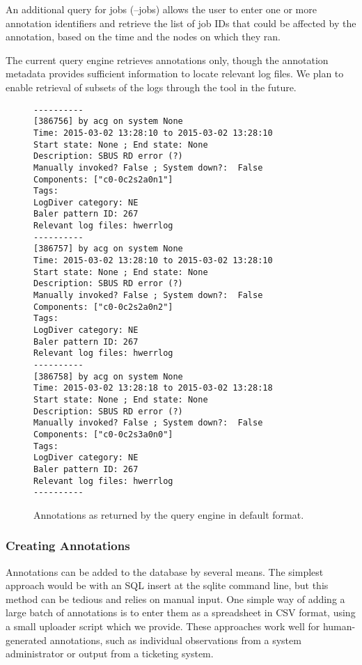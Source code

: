 An additional query for jobs (--jobs) allows the user to enter one or more annotation identifiers and retrieve the list of job IDs that could be affected by the annotation, based on the time and the nodes on which they ran.

The current query engine retrieves annotations only, though the annotation metadata provides sufficient information to locate relevant log files. We plan to enable retrieval of subsets of the logs through the tool in the future.

\begin{figure}
\begin{small}
\begin{verbatim}
----------
[386756] by acg on system None
Time: 2015-03-02 13:28:10 to 2015-03-02 13:28:10
Start state: None ; End state: None
Description: SBUS RD error (?)
Manually invoked? False ; System down?:  False
Components: ["c0-0c2s2a0n1"]
Tags:
LogDiver category: NE
Baler pattern ID: 267
Relevant log files: hwerrlog
----------
[386757] by acg on system None
Time: 2015-03-02 13:28:10 to 2015-03-02 13:28:10
Start state: None ; End state: None
Description: SBUS RD error (?)
Manually invoked? False ; System down?:  False
Components: ["c0-0c2s2a0n2"]
Tags:
LogDiver category: NE
Baler pattern ID: 267
Relevant log files: hwerrlog
----------
[386758] by acg on system None
Time: 2015-03-02 13:28:18 to 2015-03-02 13:28:18
Start state: None ; End state: None
Description: SBUS RD error (?)
Manually invoked? False ; System down?:  False
Components: ["c0-0c2s3a0n0"]
Tags:
LogDiver category: NE
Baler pattern ID: 267
Relevant log files: hwerrlog
----------

\end{verbatim}
\end{small}
\caption{Annotations as returned by the query engine in default format. }
\label{f:default_format}
\end{figure}


\subsubsection{Creating Annotations}
\label{s:creating}

Annotations can be added to the database by several means. The simplest approach would be with an SQL insert at the sqlite command line, but this method can be tedious and relies on manual input. One simple way of adding a large batch of annotations is to enter them as a spreadsheet in CSV format, using a small uploader script which we provide. These approaches work well for human-generated annotations, such as individual observations from a system administrator or output from a ticketing system.

